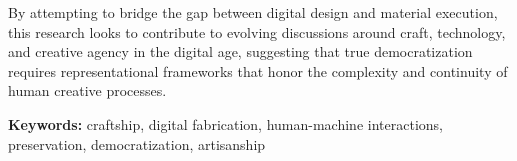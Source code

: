 \vspace{0.5cm}

By attempting to bridge the gap between digital design and material execution, this research looks to contribute to evolving discussions around craft, technology, and creative agency in the digital age, suggesting that true democratization requires representational frameworks that honor the complexity and continuity of human creative processes.

\vspace{1cm}

\noindent
\textbf{Keywords:} craftship, digital fabrication, human-machine interactions, preservation, democratization, artisanship

\vspace{\fill}